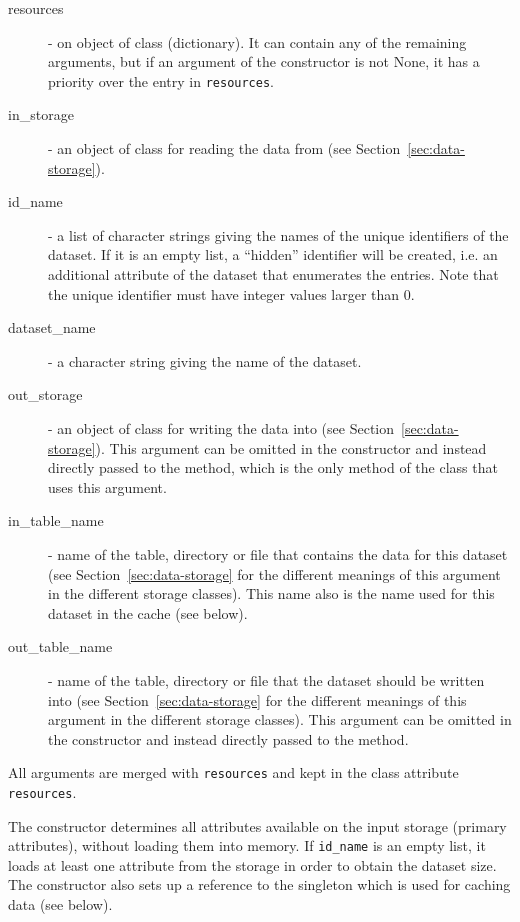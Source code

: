\begin{description}
\item[resources]  - on object of class  (dictionary). It can
  contain any of the remaining arguments, but if an argument of the
  constructor is not None, it has a priority over the entry in
  \verb|resources|.
\item[in_storage]  - an object of class  for reading the data
  from (see Section~\ref{sec:data-storage}).
\item[id_name]  - a list of character strings giving the names of the unique
  identifiers of the dataset. \datasetindex If it is an empty list, a ``hidden'' identifier
  will be created, i.e. an additional attribute of the dataset that enumerates the entries. Note that the unique identifier 
  must have integer values larger than 0.
\item[dataset_name]  - a character string giving the name of the dataset. \datasetindex
\item[out_storage]  - an object of class  for writing the data
  into (see Section~\ref{sec:data-storage}). This argument can be omitted in
  the constructor and instead directly passed to the
   method, which is the only method of the class that uses this argument.
\item[in_table_name]  - name of the table, directory or file that contains the
  data for this dataset \datasetindex (see Section~\ref{sec:data-storage} for the different
  meanings of this argument in the different storage classes).  This name also is the
  name used for this dataset \datasetindex in the cache (see below).
\item[out_table_name]  - name of the table, directory or file that the dataset \datasetindex
  should be written into (see Section~\ref{sec:data-storage} for the different
  meanings of this argument in the different storage classes). This argument
  can be omitted in the constructor and instead directly passed to the
   method.
\end{description}

All arguments are merged with \verb|resources| and kept in the class attribute \attributesindex
\verb|resources|.

The constructor determines all attributes \attributesindex available on the input storage
(primary attributes), \primaryattributesindex without loading them into memory. If \verb|id_name|
is an empty list, it loads at least one attribute \attributesindex from the storage in order to
obtain the dataset \datasetindex size. The constructor also sets up a reference to the
singleton  which is used for caching data (see below).

